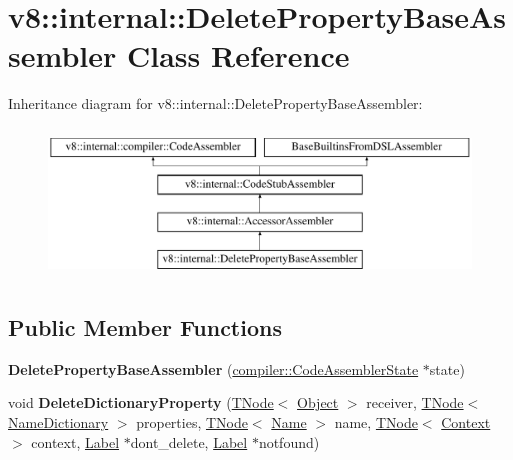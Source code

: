 \hypertarget{classv8_1_1internal_1_1DeletePropertyBaseAssembler}{}\section{v8\+:\+:internal\+:\+:Delete\+Property\+Base\+Assembler Class Reference}
\label{classv8_1_1internal_1_1DeletePropertyBaseAssembler}
Inheritance diagram for v8\+:\+:internal\+:\+:Delete\+Property\+Base\+Assembler\+:\begin{figure}[H]
\begin{center}
\leavevmode
\includegraphics[height=4.000000cm]{classv8_1_1internal_1_1DeletePropertyBaseAssembler}
\end{center}
\end{figure}
\subsection*{Public Member Functions}
\begin{DoxyCompactItemize}
\item 
\mbox{\label{classv8_1_1internal_1_1DeletePropertyBaseAssembler_a6650b670321df46c8cf88f1a49388e0c}} 
{\bfseries Delete\+Property\+Base\+Assembler} (\mbox{\hyperlink{classv8_1_1internal_1_1compiler_1_1CodeAssemblerState}{compiler\+::\+Code\+Assembler\+State}} $\ast$state)
\item 
\mbox{\label{classv8_1_1internal_1_1DeletePropertyBaseAssembler_a8d6fee672c6da687efd8b38ec65259df}} 
void {\bfseries Delete\+Dictionary\+Property} (\mbox{\hyperlink{classv8_1_1internal_1_1compiler_1_1TNode}{T\+Node}}$<$ \mbox{\hyperlink{classv8_1_1internal_1_1Object}{Object}} $>$ receiver, \mbox{\hyperlink{classv8_1_1internal_1_1compiler_1_1TNode}{T\+Node}}$<$ \mbox{\hyperlink{classv8_1_1internal_1_1NameDictionary}{Name\+Dictionary}} $>$ properties, \mbox{\hyperlink{classv8_1_1internal_1_1compiler_1_1TNode}{T\+Node}}$<$ \mbox{\hyperlink{classv8_1_1internal_1_1Name}{Name}} $>$ name, \mbox{\hyperlink{classv8_1_1internal_1_1compiler_1_1TNode}{T\+Node}}$<$ \mbox{\hyperlink{classv8_1_1internal_1_1Context}{Context}} $>$ context, \mbox{\hyperlink{classv8_1_1internal_1_1compiler_1_1CodeAssemblerLabel}{Label}} $\ast$dont\+\_\+delete, \mbox{\hyperlink{classv8_1_1internal_1_1compiler_1_1CodeAssemblerLabel}{Label}} $\ast$notfound)
\end{DoxyCompactItemize}
